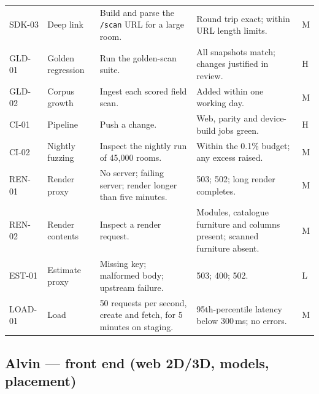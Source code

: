 \documentclass[conference,a4paper,10pt]{IEEEtran}
\begin{document}
\begin{longtable}{@{}L{1.25cm}L{3.6cm}L{5.4cm}L{5.1cm}C{0.4cm}@{}}
SDK-03 & Deep link & Build and parse the \texttt{/scan} URL for a large room. & Round trip exact; within URL length limits. & M \\
GLD-01 & Golden regression & Run the golden-scan suite. & All snapshots match; changes justified in review. & H \\
GLD-02 & Corpus growth & Ingest each scored field scan. & Added within one working day. & M \\
CI-01 & Pipeline & Push a change. & Web, parity and device-build jobs green. & H \\
CI-02 & Nightly fuzzing & Inspect the nightly run of 45{,}000 rooms. & Within the 0.1\% budget; any excess raised. & M \\
REN-01 & Render proxy & No server; failing server; render longer than five minutes. & 503; 502; long render completes. & M \\
REN-02 & Render contents & Inspect a render request. & Modules, catalogue furniture and columns present; scanned furniture absent. & M \\
EST-01 & Estimate proxy & Missing key; malformed body; upstream failure. & 503; 400; 502. & L \\
LOAD-01 & Load & 50 requests per second, create and fetch, for 5 minutes on staging. & 95th-percentile latency below 300\,ms; no errors. & M \\
\end{longtable}

\subsection{Alvin --- front end (web 2D/3D, models, placement)}\label{app:alvin}
\end{document}
